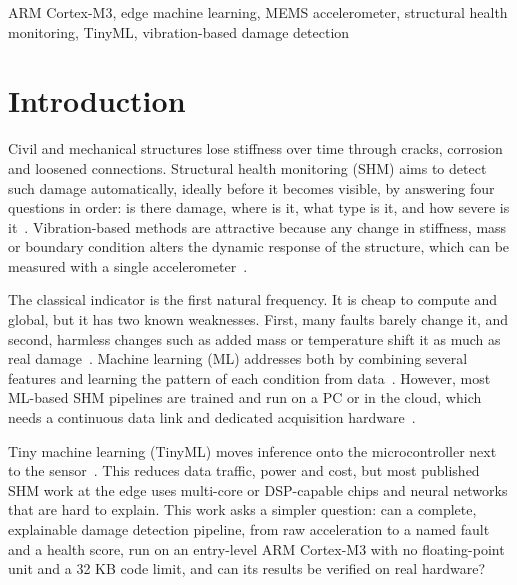 \documentclass[conference]{IEEEtran}
\begin{document}
\begin{IEEEkeywords}
ARM Cortex-M3, edge machine learning, MEMS accelerometer, structural health monitoring, TinyML, vibration-based damage detection
\end{IEEEkeywords}

\section{Introduction}
Civil and mechanical structures lose stiffness over time through cracks, corrosion and loosened connections. Structural health monitoring (SHM) aims to detect such damage automatically, ideally before it becomes visible, by answering four questions in order: is there damage, where is it, what type is it, and how severe is it~\cite{gharehbaghi2022}. Vibration-based methods are attractive because any change in stiffness, mass or boundary condition alters the dynamic response of the structure, which can be measured with a single accelerometer~\cite{hou2021,avci2021}.

The classical indicator is the first natural frequency. It is cheap to compute and global, but it has two known weaknesses. First, many faults barely change it, and second, harmless changes such as added mass or temperature shift it as much as real damage~\cite{hou2021}. Machine learning (ML) addresses both by combining several features and learning the pattern of each condition from data~\cite{avci2021,flah2021,bao2021}. However, most ML-based SHM pipelines are trained and run on a PC or in the cloud, which needs a continuous data link and dedicated acquisition hardware~\cite{malekloo2022,zonzini2020}.

Tiny machine learning (TinyML) moves inference onto the microcontroller next to the sensor~\cite{ray2022,capogrosso2024}. This reduces data traffic, power and cost, but most published SHM work at the edge uses multi-core or DSP-capable chips and neural networks that are hard to explain. This work asks a simpler question: can a complete, explainable damage detection pipeline, from raw acceleration to a named fault and a health score, run on an entry-level ARM Cortex-M3 with no floating-point unit and a 32 KB code limit, and can its results be verified on real hardware?
\end{document}
